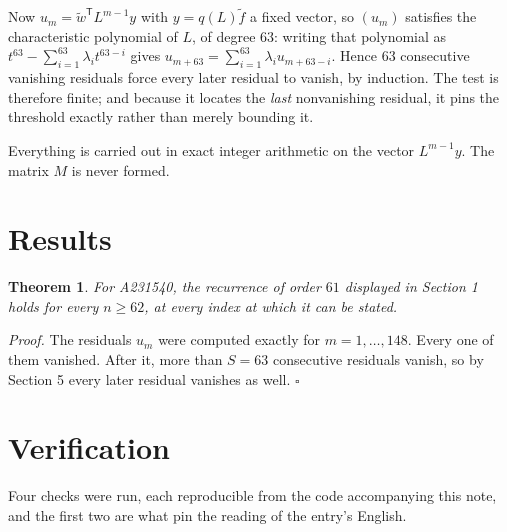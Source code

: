 \documentclass[11pt]{article}
\newtheorem{theorem}{Theorem}
\theoremstyle{definition}
\begin{document}
Now $u_m = \tilde w^{\mathsf T} L^{m-1} y$ with $y = q(L)\tilde f$ a fixed vector, so $(u_m)$ satisfies the characteristic polynomial of $L$, of degree $63$: writing that polynomial as $t^{63} - \sum_{i=1}^{63} \lambda_i t^{63-i}$ gives $u_{m+63} = \sum_{i=1}^{63} \lambda_i u_{m+63-i}$. Hence $63$ consecutive vanishing residuals force every later residual to vanish, by induction. The test is therefore finite; and because it locates the {\itshape last} nonvanishing residual, it pins the threshold exactly rather than merely bounding it.

Everything is carried out in exact integer arithmetic on the vector $L^{m-1}y$. The matrix $M$ is never formed.

\section{Results}

\begin{theorem} For A231540, the recurrence of order $61$ displayed in Section 1 holds for every $n \ge 62$, at every index at which it can be stated.\end{theorem}

{\itshape Proof.} The residuals $u_m$ were computed exactly for $m = 1,\dots,148$. Every one of them vanished. After it, more than $S = 63$ consecutive residuals vanish, so by Section 5 every later residual vanishes as well. $\square$

\section{Verification}

Four checks were run, each reproducible from the code accompanying this note, and the first two are what pin the reading of the entry's English.
\end{document}
